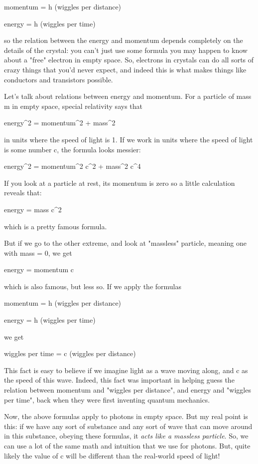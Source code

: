 momentum = h (wiggles per distance)

energy = h (wiggles per time)

so the relation between the energy and momentum depends completely 
on the details of the crystal: you can't just use some formula
you may happen to know about a "free" electron in empty space.
So, electrons in crystals can do all sorts of crazy things that
you'd never expect, and indeed this is what makes things like
conductors and transistors possible.

Let's talk about relations between energy and momentum.  For a 
particle of mass m in empty space, special relativity says that 

energy^{2} = momentum^{2} + mass^{2}

in units where the speed of light is 1.  If we work in units
where the speed of light is some number c, the formula looks messier:

energy^{2} = momentum^{2} c^{2} + mass^{2} c^{4}

If you look at a particle at rest, its momentum is zero so a little
calculation reveals that:

energy = mass c^{2}

which is a pretty famous formula.  

But if we go to the other extreme, and look at "massless" particle, 
meaning one with mass = 0, we get

energy = momentum c

which is also famous, but less so.  If we apply the formulas

momentum = h (wiggles per distance)

energy = h (wiggles per time)

we get

wiggles per time = c (wiggles per distance)

This fact is easy to believe if we imagine light as a wave moving
along, and c as the speed of this wave.  Indeed, this fact was 
important in helping guess the relation between momentum and
"wiggles per distance", and energy and "wiggles per
time", back when they were first inventing quantum mechanics.

Now, the above formulas apply to photons in empty space.  But my 
real point is this: if we have any sort of substance and any sort of
wave that can move around in this substance, obeying these formulas,
it \emph{acts like a massless particle}.  So, we can use a lot of the same 
math and intuition that we use for photons.  But, quite likely the
value of c will be different than the real-world speed of light!

